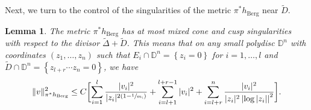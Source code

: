 \documentclass[JEP,XML,SOM,Unicode]{cedram}
\theoremstyle{plain}
\newtheorem{lemma}[theorem]{Lemma}
\theoremstyle{definition}
\numberwithin{equation}{theorem}
\newcommand{\norm}[1] { \| #1 \| }
\begin{document}
Next, we turn to the control of the singularities of the metric $\pi^\ast h_{\mathrm{Berg}}$ near $\widetilde{D}$.

\begin{lemma} The metric $\pi^\ast h_{\mathrm{Berg}}$ has at most mixed cone and cusp singularities with respect to the divisor $\widetilde{\Delta} + \widetilde{D}$. This means that on any small polydisc $\mathbb D^n$ with coordinates $(z_1, \ldots , z_n)$ such that $E_i \cap \mathbb D^n = \left\{ z_i = 0 \right\}$ for $i = 1, \ldots, l$ and $\widetilde{D} \cap \mathbb D^n = \left\{ z_{l+r} \cdots z_{n} = 0 \right\}$, we have
\begin{equation} \label{mixedconicalcusp}
\norm{v}^2_{\pi^\ast h_{\mathrm{Berg}}} \leq C \biggl[ \sum_{i = 1}^{l} \frac{|v_i|^2}{|z_i|^{2(1 - \sfrac{1}{m_i})}} + \sum_{i=l+1}^{l+r-1} |v_i|^2 + \sum_{i = l + r }^{n} \frac{|v_i|^2}{|z_i|^2 \left| \log |z_i| \right|^2} \biggr].
\end{equation}
\end{lemma}
\end{document}
